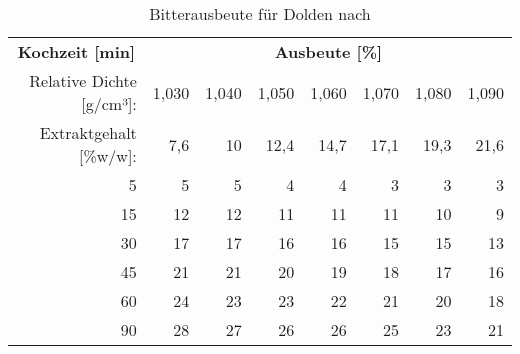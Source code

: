 \documentclass[a4paper,parskip=half]{scrartcl}
\begin{document}
\begin{table}[H]
\centering
\begin{tabular}{rrrrrrrr} 
\toprule
\multicolumn{1}{c}{\textbf{Kochzeit [min]}} & \multicolumn{7}{c}{\textbf{Ausbeute [\%]}}  \\
Relative Dichte [g/cm³]:                                        & 1,030 & 1,040 & 1,050 & 1,060 & 1,070 & 1,080  & 1,090                   \\
Extraktgehalt [\%w/w]:                                            & 7,6 & 10 & 12,4 & 14,7 & 17,1 & 19,3  & 21,6                   \\                                            
\midrule

5                                            & 5     & 5     & 4     & 4     & 3     & 3      & 3                          \\
15                                           & 12    & 12    & 11    & 11    & 11    & 10     & 9                          \\
30                                           & 17    & 17    & 16    & 16    & 15    & 15     & 13                         \\
45                                           & 21    & 21    & 20    & 19    & 18    & 17     & 16                         \\
60                                           & 24    & 23    & 23    & 22    & 21    & 20     & 18                         \\
90                                           & 28    & 27    & 26    & 26    & 25    & 23     & 21                         \\
\bottomrule
\end{tabular}
\caption{Bitterausbeute für Dolden nach \citeauthor{Mosher1994} \parencite[51]{Holle2010}}
\label{table:mosherutil}
\end{table}
\end{document}
